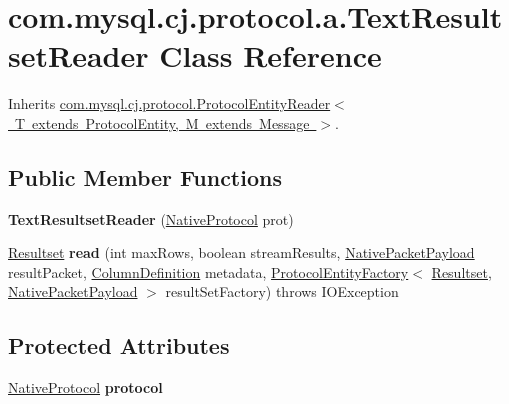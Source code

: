 \hypertarget{classcom_1_1mysql_1_1cj_1_1protocol_1_1a_1_1_text_resultset_reader}{}\section{com.\+mysql.\+cj.\+protocol.\+a.\+Text\+Resultset\+Reader Class Reference}
\label{classcom_1_1mysql_1_1cj_1_1protocol_1_1a_1_1_text_resultset_reader}


Inherits \mbox{\hyperlink{interfacecom_1_1mysql_1_1cj_1_1protocol_1_1_protocol_entity_reader}{com.\+mysql.\+cj.\+protocol.\+Protocol\+Entity\+Reader$<$ T extends Protocol\+Entity, M extends Message $>$}}.

\subsection*{Public Member Functions}
\begin{DoxyCompactItemize}
\item 
\mbox{\label{classcom_1_1mysql_1_1cj_1_1protocol_1_1a_1_1_text_resultset_reader_a215ac606c36c82b8ce20544d5f46e3c0}} 
{\bfseries Text\+Resultset\+Reader} (\mbox{\hyperlink{classcom_1_1mysql_1_1cj_1_1protocol_1_1a_1_1_native_protocol}{Native\+Protocol}} prot)
\item 
\mbox{\label{classcom_1_1mysql_1_1cj_1_1protocol_1_1a_1_1_text_resultset_reader_af5348f629df11c452f14ca207e33177d}} 
\mbox{\hyperlink{interfacecom_1_1mysql_1_1cj_1_1protocol_1_1_resultset}{Resultset}} {\bfseries read} (int max\+Rows, boolean stream\+Results, \mbox{\hyperlink{classcom_1_1mysql_1_1cj_1_1protocol_1_1a_1_1_native_packet_payload}{Native\+Packet\+Payload}} result\+Packet, \mbox{\hyperlink{interfacecom_1_1mysql_1_1cj_1_1protocol_1_1_column_definition}{Column\+Definition}} metadata, \mbox{\hyperlink{interfacecom_1_1mysql_1_1cj_1_1protocol_1_1_protocol_entity_factory}{Protocol\+Entity\+Factory}}$<$ \mbox{\hyperlink{interfacecom_1_1mysql_1_1cj_1_1protocol_1_1_resultset}{Resultset}}, \mbox{\hyperlink{classcom_1_1mysql_1_1cj_1_1protocol_1_1a_1_1_native_packet_payload}{Native\+Packet\+Payload}} $>$ result\+Set\+Factory)  throws I\+O\+Exception 
\end{DoxyCompactItemize}
\subsection*{Protected Attributes}
\begin{DoxyCompactItemize}
\item 
\mbox{\label{classcom_1_1mysql_1_1cj_1_1protocol_1_1a_1_1_text_resultset_reader_a6cde3936e649aa072e3b844e3efd48bc}} 
\mbox{\hyperlink{classcom_1_1mysql_1_1cj_1_1protocol_1_1a_1_1_native_protocol}{Native\+Protocol}} {\bfseries protocol}
\end{DoxyCompactItemize}


